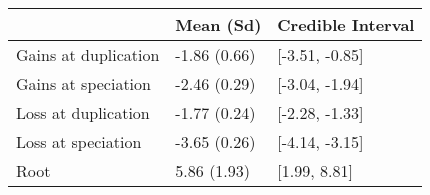 
\begin{tabular}{lll}
\toprule
  & Mean (Sd) & Credible Interval\\
\midrule
Gains at duplication & -1.86 (0.66) & {}[-3.51, -0.85]\\
Gains at speciation & -2.46 (0.29) & {}[-3.04, -1.94]\\
Loss at duplication & -1.77 (0.24) & {}[-2.28, -1.33]\\
Loss at speciation & -3.65 (0.26) & {}[-4.14, -3.15]\\
Root & 5.86 (1.93) & {}[1.99, 8.81]\\
\bottomrule
\end{tabular}
